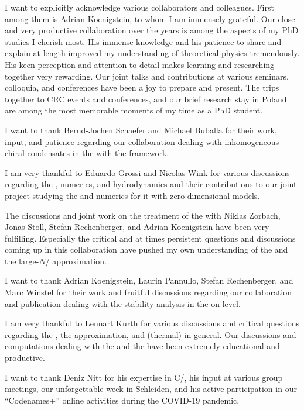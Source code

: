 I want to explicitly acknowledge various collaborators and colleagues.
First among them is Adrian Koenigstein, to whom I am immensely grateful.
Our close and very productive collaboration over the years is among the aspects of my PhD studies I cherish most.
His immense knowledge and his patience to share and explain at length improved my understanding of theoretical physics tremendously.
His keen perception and attention to detail makes learning and researching together very rewarding.
Our joint talks and contributions at various seminars, colloquia, and conferences have been a joy to prepare and present.
The trips together to CRC events and conferences, and our brief research stay in Poland are among the most memorable moments of my time as a PhD student.

I want to thank Bernd-Jochen Schaefer and Michael Buballa for their work, input, and patience regarding our collaboration dealing with inhomogeneous chiral condensates in the \qmm{} with the \frg{} framework.

I am very thankful to Eduardo Grossi and Nicolas Wink for various discussions regarding the \grg{}, numerics, and hydrodynamics and their contributions to our joint project studying the \frg{} and numerics for it with zero-dimensional models.

The discussions and joint work on the \frg{} treatment of the \gnm{} with Niklas Zorbach, Jonas Stoll, Stefan Rechenberger, and Adrian Koenigstein have been very fulfilling.
Especially the critical and at times persistent questions and discussions coming up in this collaboration have pushed my own understanding of the \grg{} and the large-$N$/\mf{} approximation.

I want to thank Adrian Koenigstein, Laurin Pannullo, Stefan Rechenberger, and Marc Winstel for their work and fruitful discussions regarding our collaboration and publication dealing with the stability analysis in the \gnm{} on \mf{} level.

I am very thankful to Lennart Kurth for various discussions and critical questions regarding the \grg{}, the \mf{} approximation, and (thermal) \qft{} in general.
Our discussions and computations dealing with the \qmm{} and the \frg{} have been extremely educational and productive.

I want to thank Deniz Nitt for his expertise in C/\Cpp{}, his input at various group meetings, our unforgettable week in Schleiden, and his active participation in our ``Codenames+'' online activities during the COVID-19 pandemic.\bigskip

